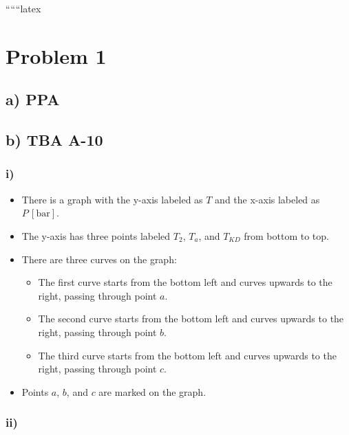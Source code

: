 
``````latex


\section*{Problem 1}

\subsection*{a) PPA}

\subsection*{b) TBA A-10}

\subsubsection*{i)}

\begin{itemize}
    \item There is a graph with the y-axis labeled as $T$ and the x-axis labeled as $P \, [\text{bar}]$.
    \item The y-axis has three points labeled $T_2$, $T_a$, and $T_{KD}$ from bottom to top.
    \item There are three curves on the graph:
        \begin{itemize}
            \item The first curve starts from the bottom left and curves upwards to the right, passing through point $a$.
            \item The second curve starts from the bottom left and curves upwards to the right, passing through point $b$.
            \item The third curve starts from the bottom left and curves upwards to the right, passing through point $c$.
        \end{itemize}
    \item Points $a$, $b$, and $c$ are marked on the graph.
\end{itemize}

\subsubsection*{ii)}

